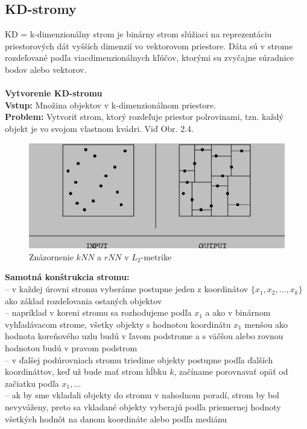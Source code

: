 \documentclass[12pt,oneside]{fithesis2}
\begin{document}
\subsection{KD-stromy}
KD = k-dimenzionálny strom \cite{Kibriya2007} je binárny strom slúžiaci na reprezentáciu priestorových dát vyšších dimenzií vo vektorovom priestore. Dáta sú v strome rozdeľované podľa viacdimenzionálnych kľúčov, ktorými su zvyčajne súradnice bodov alebo vektorov. \\ \\
\textbf{Vytvorenie KD-stromu}\\
\textbf{Vstup:} Množina objektov v k-dimenzionálnom priestore. \\
\textbf{Problem:} Vytvoriť strom, ktorý rozdeľuje priestor polrovinami, tzn. každý objekt je vo svojom vlastnom kvádri. Viď Obr. 2.4.\\
\begin{figure}
  		\centering
  		\includegraphics[width=13cm]{obr/kdtree.eps}
  		\caption{Znázornenie $kNN$ a $rNN$ v $L_2$-metrike}
\end{figure}
\textbf{Samotná konštrukcia stromu:} \\ 
-- v každej úrovni stromu vyberáme postupne jeden z koordinátov $ \{ x_1,x_2,...,x_k \} $ ako základ rozdeľovania ostaných objektov \\
-- napríklad v koreni stromu sa rozhodujeme podľa $x_1$ a ako v binárnom vyhľadávacom strome, všetky objekty s hodnotou koordinátu $x_1$ menšou ako hodnota koreňového uzlu budú v ľavom podstrome a s väčšou alebo rovnou hodnotou budú v pravom podstrom \\
-- v ďalšej podúrovniach stromu triedime objekty postupne podľa ďalších koordináttov, keď už bude mať strom hĺbku $k$, začíname porovnavať opäť od začiatku podľa $x_1,...$ \\
-- ak by sme vkladali objekty do stromu v nahodnom poradí, strom by bol nevyváženy, preto sa vkladané objekty vyberajú podľa priemernej hodnoty všetkých hodnôt na danom koordináte alebo podľa mediánu \\
\end{document}
